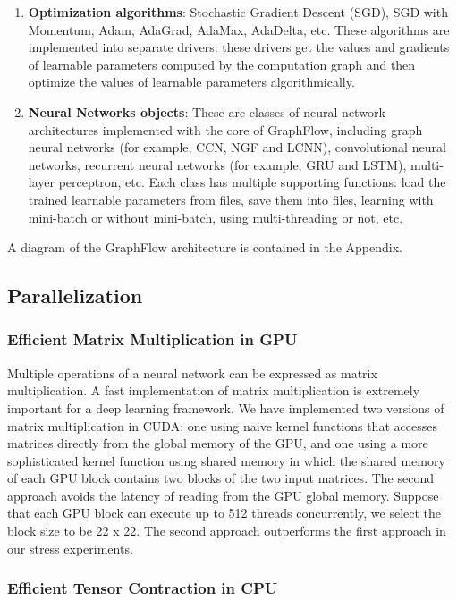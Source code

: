 \documentclass[a4paper]{article}
\begin{document}
\begin{enumerate}
	\item \textbf{Optimization algorithms}: Stochastic Gradient Descent (SGD), SGD with Momentum, Adam, AdaGrad, AdaMax, AdaDelta, etc. These algorithms are implemented into separate drivers: these drivers get the values and gradients of learnable parameters computed by the computation graph and then optimize the values of learnable parameters algorithmically.
	
	\item \textbf{Neural Networks objects}: These are classes of neural network architectures implemented with the core of GraphFlow, including graph neural networks (for example, CCN, NGF and LCNN), convolutional neural networks, recurrent neural networks (for example, GRU and LSTM), multi-layer perceptron, etc. Each class has multiple supporting functions: load the trained learnable parameters from files, save them into files, learning with mini-batch or without mini-batch, using multi-threading or not, etc.
\end{enumerate}
A diagram of the GraphFlow architecture is contained in the Appendix.

\subsection{Parallelization}

\subsubsection{Efficient Matrix Multiplication in GPU}

Multiple operations of a neural network can be expressed as matrix multiplication. A fast implementation of matrix multiplication is extremely important for a deep learning framework. We have implemented two versions of matrix multiplication in CUDA: one using naive kernel functions that accesses matrices directly from the global memory of the GPU, and one using a more sophisticated kernel function using shared memory in which the shared memory of each GPU block contains two blocks of the two input matrices. The second approach avoids the latency of reading from the GPU global memory. Suppose that each GPU block can execute up to 512 threads concurrently, we select the block size to be 22 x 22. The second approach outperforms the first approach in our stress experiments.

\subsubsection{Efficient Tensor Contraction in CPU}
\end{document}
